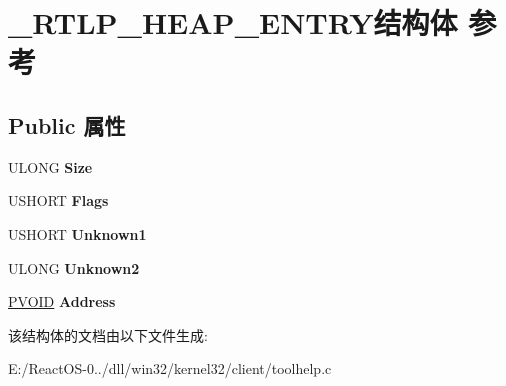 \hypertarget{struct___r_t_l_p___h_e_a_p___e_n_t_r_y}{}\section{\+\_\+\+R\+T\+L\+P\+\_\+\+H\+E\+A\+P\+\_\+\+E\+N\+T\+R\+Y结构体 参考}
\label{struct___r_t_l_p___h_e_a_p___e_n_t_r_y}
\subsection*{Public 属性}
\begin{DoxyCompactItemize}
\item 
\mbox{\label{struct___r_t_l_p___h_e_a_p___e_n_t_r_y_a9419d71272de3d94d4c796ad10f5867e}} 
U\+L\+O\+NG {\bfseries Size}
\item 
\mbox{\label{struct___r_t_l_p___h_e_a_p___e_n_t_r_y_a8f2ce006658df1f4ac60f4eddba25097}} 
U\+S\+H\+O\+RT {\bfseries Flags}
\item 
\mbox{\label{struct___r_t_l_p___h_e_a_p___e_n_t_r_y_a035e96b58e88f7bb0d291d5ce7abb905}} 
U\+S\+H\+O\+RT {\bfseries Unknown1}
\item 
\mbox{\label{struct___r_t_l_p___h_e_a_p___e_n_t_r_y_a85a2e3492872d0c0b2f65737481aa03c}} 
U\+L\+O\+NG {\bfseries Unknown2}
\item 
\mbox{\label{struct___r_t_l_p___h_e_a_p___e_n_t_r_y_a665c4391fccc89c2f16c33d3babaf8e3}} 
\hyperlink{interfacevoid}{P\+V\+O\+ID} {\bfseries Address}
\end{DoxyCompactItemize}


该结构体的文档由以下文件生成\+:\begin{DoxyCompactItemize}
\item 
E\+:/\+React\+O\+S-\/0../dll/win32/kernel32/client/toolhelp.\+c\end{DoxyCompactItemize}
